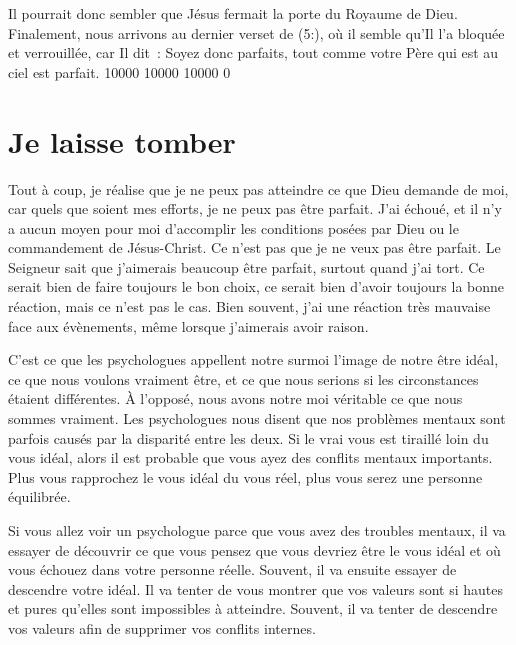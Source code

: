 Il pourrait donc sembler que Jésus fermait la porte du Royaume de Dieu.
 Finalement, nous arrivons au dernier verset de (5:),
 où il semble qu'Il l'a bloquée et verrouillée, car Il dit~:
 \og Soyez donc parfaits,
 tout comme votre Père qui est au ciel est parfait. \fg{}
 \begingroup{} 10000 10000 10000 0
 \par\endgroup


\section{Je laisse tomber}

\begin{specialpar}{}
Tout à coup, je réalise que je ne peux pas atteindre
 ce que Dieu demande de moi, car quels que soient mes efforts,
 je ne peux pas être parfait.
 J'ai échoué, et il n'y a aucun moyen pour moi d'accomplir
 les conditions posées par Dieu ou le commandement de Jésus-Christ.
 Ce n'est pas que je ne veux pas être parfait.
 Le Seigneur sait que j'aimerais beaucoup être parfait,
 surtout quand j'ai tort.
 Ce serait bien de faire toujours le bon choix,
 ce serait bien d'avoir toujours la bonne réaction,
 mais ce n'est pas le cas.
 Bien souvent, j'ai une réaction très mauvaise face aux évènements,
 même lorsque j'aimerais avoir raison.
\end{specialpar}

\begin{specialpar}{}
C'est ce que les psychologues appellent notre surmoi
 \ocadr l'image de notre être idéal, ce que nous voulons vraiment être,
 et ce que nous serions si les circonstances étaient différentes.
 À l'opposé, nous avons notre moi véritable
 \ocadr ce que nous sommes vraiment.
 Les psychologues nous disent que nos problèmes mentaux
 sont parfois causés par la disparité entre les deux.
 Si le vrai vous est tiraillé loin du vous idéal, alors il est probable
 que vous ayez des conflits mentaux importants.
 Plus vous rapprochez le vous idéal du vous réel,
 plus vous serez une personne équilibrée.
\end{specialpar}

\begin{specialpar}{}
Si vous allez voir un psychologue parce que vous avez des troubles mentaux,
 il va essayer de découvrir ce que vous pensez que vous devriez être
 \ocadr le vous idéal \fcadr{}
 et où vous échouez dans votre personne réelle.
 Souvent, il va ensuite essayer de descendre votre idéal.
 Il va tenter de vous montrer que vos valeurs sont si hautes et pures
 qu'elles sont impossibles à atteindre.
 Souvent, il va tenter de descendre vos valeurs
 afin de supprimer vos conflits internes.
\end{specialpar}

